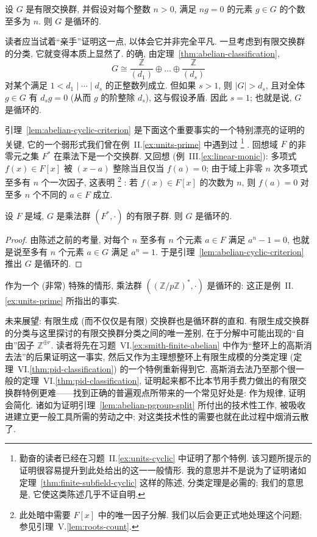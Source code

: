 \begin{lemma}
\label{lem:abelian-cyclic-criterion}
设 $G$ 是有限交换群, 并假设对每个整数 $n>0$, 满足 $n g = 0$ 的元素 $g \in G$ 的个数至多为 $n$. 则 $G$ 是循环的.
\end{lemma}

读者应当试着``亲手''证明这一点, 以体会它并非完全平凡. 一旦考虑到有限交换群的分类, 它就变得本质上显然了. 的确, 由定理~\ref{thm:abelian-classification},
\[
G \cong \frac{\mathbb{Z}}{(d_1)} \oplus \dots \oplus \frac{\mathbb{Z}}{(d_s)}
\]
对某个满足 $1 < d_1 \mid \cdots \mid d_s$ 的正整数列成立. 但如果 $s > 1$, 则 $|G| > d_s$, 且对全体 $g \in G$ 有 $d_s g = 0$ (从而 $g$ 的阶整除 $d_s$), 这与假设矛盾. 因此 $s = 1$; 也就是说, $G$ 是循环的.

引理~\ref{lem:abelian-cyclic-criterion} 是下面这个重要事实的一个特别漂亮的证明的关键, 它的一个弱形式我们曾在例~II.\ref{ex:units-prime} 中遇到过%
\footnote{勤奋的读者已经在习题~II.\ref{ex:units-cyclic} 中证明了那个特例. 该习题所提示的证明很容易提升到此处给出的这一一般情形. 我的意思并不是说为了证明诸如定理~\ref{thm:finite-subfield-cyclic} 这样的陈述, 分类定理是必需的; 我们的意思是, 它使这类陈述几乎不证自明.}%
. 回想域 $F$ 的非零元之集 $F^{*}$ 在乘法下是一个交换群. 又回想 (例~III.\ref{ex:linear-monic}): 多项式 $f(x) \in F[x]$ 被 $(x - a)$ 整除当且仅当 $f(a) = 0$; 由于域上非零 $n$ 次多项式至多有 $n$ 个一次因子, 这表明%
\footnote{此处暗中需要 $F[x]$ 中的唯一因子分解. 我们以后会更正式地处理这个问题; 参见引理~V.\ref{lem:roots-count}.}%
: 若 $f(x) \in F[x]$ 的次数为 $n$, 则 $f(a) = 0$ 对至多 $n$ 个不同的 $a \in F$ 成立.

\begin{theorem}
\label{thm:finite-subfield-cyclic}
设 $F$ 是域, $G$ 是乘法群 $(F^*, \cdot)$ 的有限子群. 则 $G$ 是循环的.
\end{theorem}

\begin{proof}
由陈述之前的考量, 对每个 $n$ 至多有 $n$ 个元素 $a \in F$ 满足 $a^n - 1 = 0$, 也就是说至多有 $n$ 个元素 $a \in G$ 满足 $a^n = 1$. 于是引理~\ref{lem:abelian-cyclic-criterion} 推出 $G$ 是循环的.
\end{proof}

作为一个 (非常) 特殊的情形, 乘法群 $((\mathbb{Z}/p\mathbb{Z})^{*}, \cdot)$ 是循环的: 这正是例~II.\ref{ex:units-prime} 所指出的事实.

未来展望: 有限生成 (而不仅仅是有限) 交换群也是循环群的直和. 有限生成交换群的分类与这里探讨的有限交换群分类之间的唯一差别, 在于分解中可能出现的``自由''因子 $\mathbb{Z}^{\oplus r}$. 读者将先在习题~VI.\ref{ex:smith-finite-abelian} 中作为``整环上的高斯消去法''的后果证明这一事实, 然后又作为主理想整环上有限生成模的分类定理 (定理~VI.\ref{thm:pid-classification}) 的一个特例重新得到它. 高斯消去法乃至那个很一般的定理~VI.\ref{thm:pid-classification}, 证明起来都不比本节用手费力做出的有限交换群特例更难——找到正确的普遍观点所带来的一个常见好处是: 作为规律, 证明会简化. 诸如为证明引理~\ref{lem:abelian-pgroup-split} 所付出的技术性工作, 被吸收进建立更一般工具所需的劳动之中; 对这类技术性的需要也就在此过程中烟消云散了.


